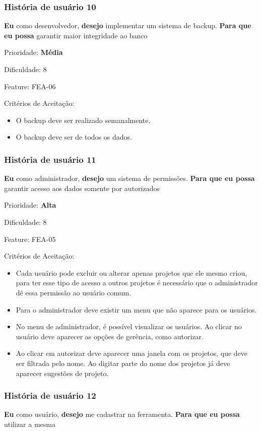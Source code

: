   \subsubsection{História de usuário 10}
    \textbf{Eu} como desenvolvedor, \textbf{desejo} implementar um sistema de backup. \textbf{Para que eu possa} garantir maior integridade ao banco

    Prioridade: \textbf{Média}

    Dificuldade: 8

    Feature: FEA-06

    Critérios de Aceitação:
    \begin{itemize}
      \item O backup deve ser realizado semanalmente.
      \item O backup deve ser de todos os dados.
    \end{itemize}

  \subsubsection{História de usuário 11}
    \textbf{Eu} como administrador, \textbf{desejo} um sistema de permissões. \textbf{Para que eu possa} garantir acesso aos dados somente por autorizados

    Prioridade: \textbf{Alta}

    Dificuldade: 8

    Feature: FEA-05

    Critérios de Aceitação:
    \begin{itemize}
      \item Cada usuário pode excluir ou alterar apenas projetos que ele mesmo criou, para ter esse tipo de acesso a outros projetos é necessário que o administrador dê essa permissão ao usuário comum.
      \item Para o administrador deve existir um menu que não aparece para os usuários.
      \item No menu de administrador, é possível visualizar os usuários. Ao clicar no usuário deve aparecer as opções de gerência, como autorizar.
      \item Ao clicar em autorizar deve aparecer uma janela com os projetos, que deve ser filtrada pelo nome. Ao digitar parte do nome dos projetos já deve aparecer sugestões de projeto.
    \end{itemize}

  \subsubsection{História de usuário 12}
    \textbf{Eu} como usuário, \textbf{desejo} me cadastrar na ferramenta. \textbf{Para que eu possa} utilizar a mesma

